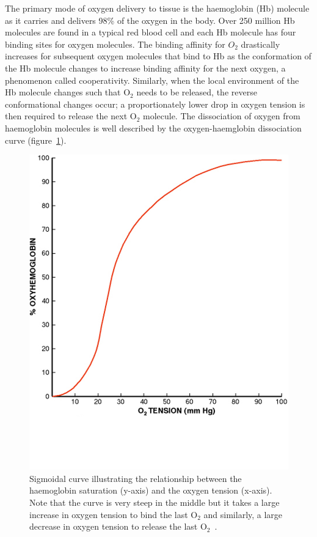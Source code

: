 The primary mode of oxygen delivery to tissue is the haemoglobin (\acs{Hb}) molecule as it carries and delivers 98\% of the oxygen in the body. 
Over 250 million \acs{Hb} molecules are found in a typical red blood cell and each \acs{Hb} molecule has four binding sites for oxygen molecules. 
The binding affinity for ${O_2}$ drastically increases for subsequent oxygen molecules that bind to \acs{Hb} as the conformation of the \acs{Hb} molecule changes to increase binding affinity for the next oxygen, a phenomenon called cooperativity. 
Similarly, when the local environment of the \acs{Hb} molecule changes such that O$_2$ needs to be released, the reverse conformational changes occur; a proportionately lower drop in oxygen tension is then required to release the next O$_2$ molecule. 
The dissociation of oxygen from haemoglobin molecules is well described by the oxygen-haemglobin dissociation curve (figure~\ref{HBdis}).

	\begin{figure}
		\begin{center}
		\includegraphics[width=\textwidth]{./intro/intro-images/HBdis.png}
		\caption{Sigmoidal curve illustrating the relationship between the haemoglobin saturation (y-axis) and the oxygen tension (x-axis). Note that the curve is very steep in the middle but it takes a large increase in oxygen tension to bind the last O$_2$ and similarly, a large decrease in oxygen tension to release the last  O$_2$~\cite{GomezCambronero:2001hu}.}
		\label{HBdis}
		\end{center}
	\end{figure}	

